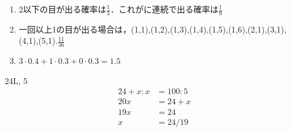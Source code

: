 \documentclass{ltjsarticle}
\begin{document}
\begin{enumerate}
  20の答えは①
  \begin{align}
    \sigma^{2}_{xy} &= \frac{(-1)(-1)+0\cdot (-2)+1\cdot 1+ 0\cdot 2}{4}\\
    &= 1/2
  \end{align}
  21の答えは③\\
  相関係数$r$は
  \begin{align}
    r&= \frac{\sigma^{2}_{xy}}{\sqrt{\sigma^{2}_{y}}\cdot \sqrt{\sigma^{2}_{y}}} \\
    &= \frac{1/2}{\sqrt{\frac{5}{4}}} \\
    &= \frac{1}{\sqrt{5}} >0
  \end{align}
  22の答えは①

  \item [設問23] 2以下の目が出る確率は$\frac{1}{3}$．これがに連続で出る確率は$\frac{1}{9}$
  
  \item [設問24] 一回以上1の目が出る場合は，(1,1),(1,2),(1,3),(1,4),(1,5),(1,6),(2,1),(3,1),(4,1),(5,1).$\frac{11}{36}$

  \item [設問25] $3\cdot 0.4 + 1 \cdot 0.3 + 0\cdot 0.3 = 1.5$
\end{enumerate}

24L, 5%
\begin{align}
  24 + x:x &= 100:5 \\
  20x &= 24+x\\
  19x &= 24\\
  x &= 24/19
\end{align}
\end{document}
